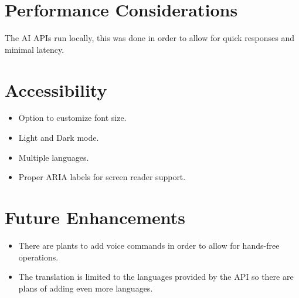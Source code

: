 \documentclass{article}
\begin{document}
\section{Performance Considerations}
The AI APIs run locally, this was done in order to allow for quick responses and minimal latency.

\section{Accessibility}
\begin{itemize}
    \item Option to customize font size.
    \item Light and Dark mode.
    \item Multiple languages.
    \item Proper ARIA labels for screen reader support.
\end{itemize}

\section{Future Enhancements}
\begin{itemize}
    \item There are plants to add voice commands in order to allow for hands-free operations.
    \item The translation is limited to the languages provided by the API so there are plans of adding even more languages.
\end{itemize}
\end{document}
